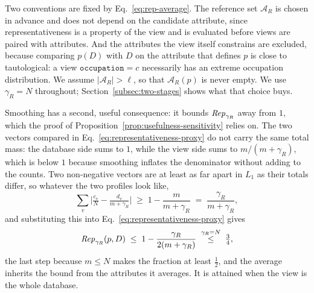 Two conventions are fixed by Eq.~\eqref{eq:rep-average}.
The reference set $\mathcal{A}_R$ is chosen in advance and does not depend on the candidate attribute, since representativeness is a property of the view and is evaluated before views are paired with attributes.
And the attributes the view itself constrains are excluded, because comparing $p(D)$ with $D$ on the attribute that defines $p$ is close to tautological: a view $\texttt{occupation}=c$ necessarily has an extreme occupation distribution.
We assume $|\mathcal{A}_R|>\ell$, so that $\mathcal{A}_R(p)$ is never empty.
We use $\gamma_R=N$ throughout; Section~\ref{subsec:two-stages} shows what that choice buys.

Smoothing has a second, useful consequence: it bounds $\mathit{Rep}_{\gamma_R}$ away from $1$, which the proof of Proposition~\ref{prop:usefulness-sensitivity} relies on.
The two vectors compared in Eq.~\eqref{eq:representativeness-proxy} do not carry the same total mass: the database side sums to $1$, while the view side sums to $m/(m+\gamma_R)$, which is below $1$ because smoothing inflates the denominator without adding to the counts.
Two non-negative vectors are at least as far apart in $L_1$ as their totals differ, so whatever the two profiles look like,
\[
\sum_v\Big|\tfrac{c_v}{N}-\tfrac{d_v}{m+\gamma_R}\Big|\;\ge\;1-\frac{m}{m+\gamma_R}\;=\;\frac{\gamma_R}{m+\gamma_R},
\]
and substituting this into Eq.~\eqref{eq:representativeness-proxy} gives
\begin{equation}
\mathit{Rep}_{\gamma_R}(p,D)\;\le\;1-\frac{\gamma_R}{2(m+\gamma_R)}\;\overset{\gamma_R=N}{\le}\;\tfrac{3}{4},
\label{eq:rep-upper}
\end{equation}
the last step because $m\le N$ makes the fraction at least $\tfrac12$, and the average inherits the bound from the attributes it averages.
It is attained when the view is the whole database.

